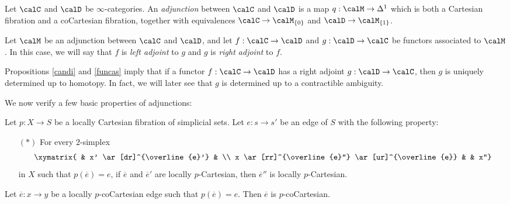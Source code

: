 \begin{definition}
Let $\calC$ and $\calD$ be $\infty$-categories. An {\it adjunction} between $\calC$ and $\calD$ is a map $q: \calM \rightarrow \Delta^1$ which is both a Cartesian fibration and a coCartesian fibration, together with equivalences $\calC \rightarrow \calM_{\{0\}}$ and $\calD \rightarrow \calM_{\{1\}}$.

Let $\calM$ be an adjunction between $\calC$ and $\calD$, and let $f: \calC \rightarrow \calD$ and $g: \calD \rightarrow \calC$ be functors associated to $\calM$. In this case, we will say that $f$ is {\it left adjoint} to $g$ and $g$ is {\it right adjoint} to $f$.
\end{definition}

\begin{remark}
Propositions \ref{candi} and \ref{funcas} imply that if a functor $f: \calC \rightarrow \calD$ has a right adjoint $g: \calD \rightarrow \calC$, then $g$ is uniquely determined up to homotopy. In fact, we will later see that $g$ is determined up to a contractible ambiguity.
\end{remark}

We now verify a few basic properties of adjunctions:

\begin{lemma}\label{gruft}
Let $p: X \rightarrow S$ be a locally Cartesian fibration of simplicial sets. Let $e: s \rightarrow s'$ be an edge of $S$ with the following property:
\begin{itemize}
\item[$(\ast)$] For every $2$-simplex
$$ \xymatrix{ & x' \ar[dr]^{\overline{e}'} & \\
x \ar[rr]^{\overline{e}''} \ar[ur]^{\overline{e}} & & x''}$$
in $X$ such that $p( \overline{e}) = e$, if $\overline{e}$ and $\overline{e}'$ are locally $p$-Cartesian, then $\overline{e}''$ is locally $p$-Cartesian.
\end{itemize}
Let $\overline{e}: x \rightarrow y$ be a locally $p$-coCartesian edge such that
$p( \overline{e} ) = e$. Then $\overline{e}$ is $p$-coCartesian.
\end{lemma}

